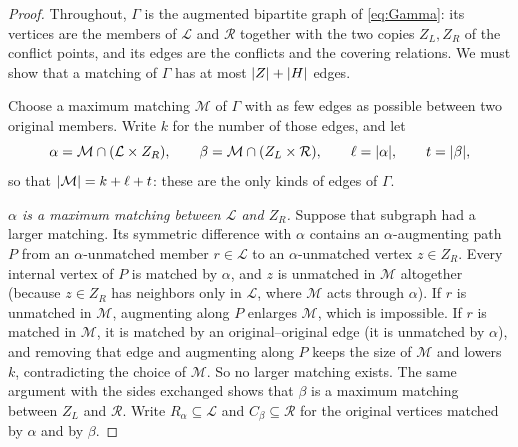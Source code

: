 \begin{proof}
\label{step:gamma}
Throughout, $\Gamma$ is the augmented bipartite graph of \eqref{eq:Gamma}: its vertices are the
members of $\mathcal L$ and $\mathcal R$ together with the two copies $Z_L,Z_R$ of the conflict
points, and its edges are the conflicts and the covering relations. We must show that a matching of
$\Gamma$ has at most $\lvert Z\rvert+\lvert H\rvert$ edges.

Choose a maximum matching $\mathcal M$ of $\Gamma$ with as few edges as possible between two original
members. Write $k$ for the number of those edges, and let
\begin{equation}\label{eq:alpha-beta}
 \alpha=\mathcal M\cap(\mathcal L\times Z_R),\qquad
 \beta=\mathcal M\cap(Z_L\times\mathcal R),\qquad
 \ell=\lvert \alpha\rvert,\qquad t=\lvert \beta\rvert,
\end{equation}
so that $\lvert \mathcal M\rvert=k+\ell+t$: these are the only kinds of edges of $\Gamma$.

\emph{$\alpha$ is a maximum matching between $\mathcal L$ and $Z_R$.} Suppose that subgraph had a
larger matching. Its symmetric difference with $\alpha$ contains an $\alpha$-augmenting path $P$
from an $\alpha$-unmatched member $r\in\mathcal L$ to an $\alpha$-unmatched vertex $z\in Z_R$. Every
internal vertex of $P$ is matched by $\alpha$, and $z$ is unmatched in $\mathcal M$ altogether
(because $z\in Z_R$ has neighbors only in $\mathcal L$, where $\mathcal M$ acts through $\alpha$).
If $r$ is unmatched in $\mathcal M$, augmenting along $P$ enlarges $\mathcal M$, which is impossible.
If $r$ is matched in $\mathcal M$, it is matched by an original--original edge (it is unmatched by
$\alpha$), and removing that edge and augmenting along $P$ keeps the size of $\mathcal M$ and lowers
$k$, contradicting the choice of $\mathcal M$. So no larger matching exists. The same argument with
the sides exchanged shows that $\beta$ is a maximum matching between $Z_L$ and $\mathcal R$. Write
$R_\alpha\subseteq\mathcal L$ and $C_\beta\subseteq\mathcal R$ for the original vertices matched by
$\alpha$ and by $\beta$.


\end{proof}
